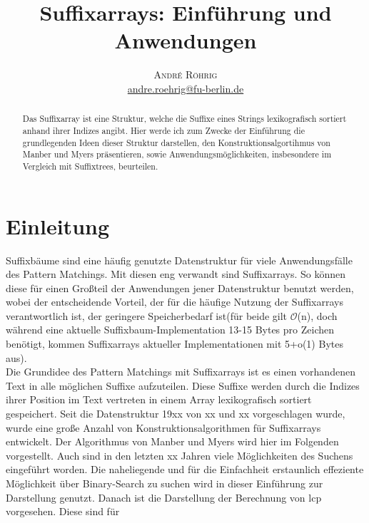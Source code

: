 \documentclass[twoside]{article}
\title{\vspace{-15mm}\fontsize{24pt}{10pt}\selectfont\textbf{Suffixarrays:
    Einführung und Anwendungen
}} %
\author{
\large
\textsc{André Röhrig} \\ %
\normalsize \href{mailto:andre.roehrig@fu-berlin.de}{andre.roehrig@fu-berlin.de} %
\vspace{-5mm}
}
\date{}
\begin{document}
\maketitle %

\thispagestyle{fancy} %

\begin{abstract}Das Suffixarray ist eine Struktur, welche
  die Suffixe eines Strings lexikografisch sortiert anhand
  ihrer Indizes angibt. Hier werde ich zum Zwecke der
  Einführung die grundlegenden Ideen dieser Struktur
  darstellen, den Konstruktionsalgortihmus von Manber und
  Myers präsentieren, sowie
  Anwendungsmöglichkeiten, insbesondere im Vergleich mit
  Suffixtrees, beurteilen.

\noindent

\end{abstract}

\section{Einleitung}
Suffixbäume sind eine häufig genutzte Datenstruktur für
viele Anwendungsfälle des Pattern Matchings. Mit diesen eng
verwandt sind Suffixarrays. So können diese für einen
Großteil der Anwendungen jener Datenstruktur benutzt werden,
wobei der entscheidende Vorteil, der für die häufige Nutzung
der Suffixarrays verantwortlich ist, der geringere
Speicherbedarf ist(für beide gilt $\mathcal{O}$(n), doch während
eine aktuelle Suffixbaum-Implementation 13-15 Bytes pro
Zeichen benötigt, kommen Suffixarrays aktueller
Implementationen mit 5+o(1) Bytes aus). \\
Die Grundidee des Pattern Matchings mit Suffixarrays ist es einen vorhandenen
Text in alle möglichen Suffixe aufzuteilen. Diese Suffixe
werden durch die Indizes ihrer Position im Text vertreten in einem Array
lexikografisch sortiert gespeichert. Seit die Datenstruktur
19xx von xx und xx vorgeschlagen wurde, wurde eine große
Anzahl von Konstruktionsalgorithmen für Suffixarrays
entwickelt. Der Algorithmus von Manber und Myers wird hier
im Folgenden vorgestellt.
Auch sind in den letzten xx Jahren viele Möglichkeiten des
Suchens eingeführt worden. Die naheliegende und für die
Einfachheit erstaunlich effeziente Möglichkeit über
Binary-Search zu suchen wird in dieser Einführung zur
Darstellung genutzt.
Danach ist die Darstellung der Berechnung von lcp
vorgesehen. Diese sind für
\end{document}

